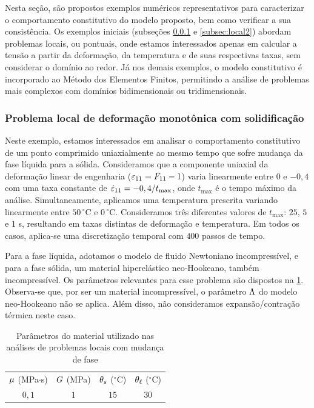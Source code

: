 \documentclass[Tese.tex]{subfiles}
\begin{document}
Nesta seção, são propostos exemplos numéricos representativos para caracterizar o comportamento constitutivo do modelo proposto, bem como verificar a sua consistência. Os exemplos iniciais (subseções \ref{subsec:local1} e \ref{subsec:local2}) abordam problemas locais, ou pontuais, onde estamos interessados apenas em calcular a tensão a partir da deformação, da temperatura e de suas respectivas taxas, sem considerar o domínio ao redor. Já nos demais exemplos, o modelo constitutivo é incorporado ao Método dos Elementos Finitos, permitindo a análise de problemas mais complexos com domínios bidimensionais ou tridimensionais.

\subsubsection{Problema local de deformação monotônica com solidificação}\label{subsec:local1}

Neste exemplo, estamos interessados em analisar o comportamento constitutivo de um ponto comprimido uniaxialmente ao mesmo tempo que sofre mudança da fase líquida para a sólida. Consideramos que a componente uniaxial da deformação linear de engenharia (${\varepsilon}_{11} = F_{11}-1$) varia linearmente entre $0$ e $-0,4$ com uma taxa constante de $\dot{{\varepsilon}}_{11} = -0,4/t_\text{max}$, onde $t_\text{max}$ é o tempo máximo da análise. Simultaneamente, aplicamos uma temperatura prescrita variando linearmente entre $50\,^{\circ}$C e $0\,^{\circ}$C. Consideramos três diferentes valores de $t_\text{max}$: $25$, $5$ e $1$ s, resultando em taxas distintas de deformação e temperatura. Em todos os casos, aplica-se uma discretização temporal com $400$ passos de tempo.

Para a fase líquida, adotamos o modelo de fluido Newtoniano incompressível, e para a fase sólida, um material hiperelástico neo-Hookeano, também incompressível. Os parâmetros relevantes para esse problema são dispostos na \cref{tab:parametros-phasechangemonotonic}. Observa-se que, por ser um material incompressível, o parâmetro $\Lambda$ do modelo neo-Hookeano não se aplica. Além disso, não consideramos expansão/contração térmica neste caso.

\begin{table}[!htb]
	\centering
	\caption{Parâmetros do material utilizado nas análises de problemas locais com mudança de fase}
	\footnotesize
	\label{tab:parametros-phasechangemonotonic}
	{\renewcommand{\arraystretch}{1.1}
		\begin{tabular}{cccc}
			\hline
			\rowcolor{LightGray}
			$\mu$ (MPa$\cdot$s) & $G$ (MPa) & $\theta_s$ ($^{\circ}$C) & $\theta_\ell$ ($^{\circ}$C)  \\  
			$0,1$ & $1$ & $15$ & $30$  \\ \hline
		\end{tabular}
	}
\end{table}
\end{document}
